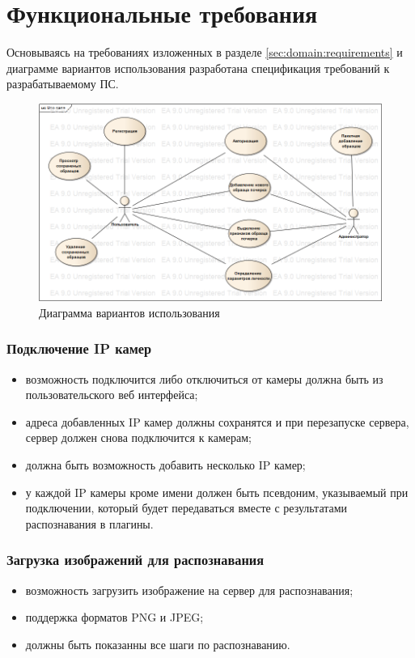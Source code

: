 \section{Функциональные требования}
\label{sec:freq}

Основываясь на требованиях изложенных в разделе \ref{sec:domain:requirements} и диаграмме вариантов использования разработана спецификация требований к разрабатываемому ПС.

\begin{figure}[p]
\centering
    \includegraphics[scale=1]{figures/use_case.png}  
    \caption{Диаграмма вариантов использования}
  \label{fig:freg:usecase}
\end{figure}

\subsubsection{Подключение IP камер}
\begin{itemize}
	\item возможность подключится либо отключиться от камеры должна быть из пользовательского веб интерфейса;
	\item адреса добавленных IP камер должны сохранятся и при перезапуске сервера, сервер должен снова подключится к камерам;
	\item должна быть возможность добавить несколько IP камер;
	\item у каждой IP камеры кроме имени должен быть псевдоним, указываемый при подключении, который будет передаваться вместе с результатами распознавания в плагины.
\end{itemize}

\subsubsection{Загрузка изображений для распознавания}
\begin{itemize}
	\item возможность загрузить изображение на сервер для распознавания;
	\item поддержка форматов PNG и JPEG;
  \item должны быть показанны все шаги по распознаванию.
\end{itemize}

